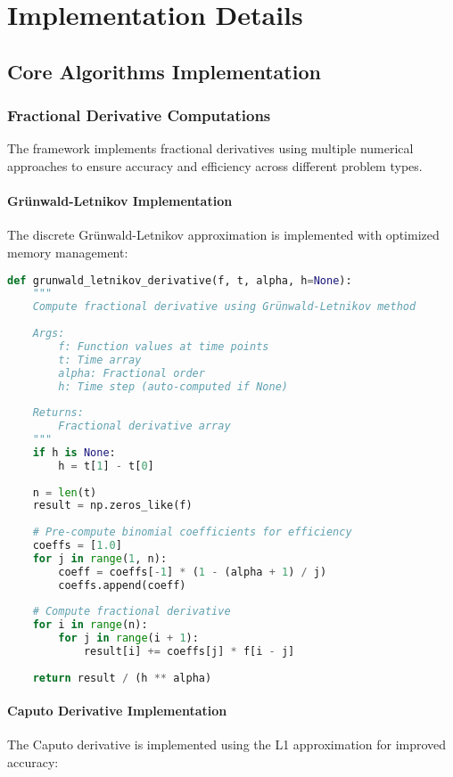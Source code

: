 \section{Implementation Details}

\subsection{Core Algorithms Implementation}

\subsubsection{Fractional Derivative Computations}

The framework implements fractional derivatives using multiple numerical approaches to ensure accuracy and efficiency across different problem types.

\paragraph{Grünwald-Letnikov Implementation}
The discrete Grünwald-Letnikov approximation is implemented with optimized memory management:

\begin{lstlisting}[language=Python, caption=Grünwald-Letnikov Implementation]
def grunwald_letnikov_derivative(f, t, alpha, h=None):
    """
    Compute fractional derivative using Grünwald-Letnikov method
    
    Args:
        f: Function values at time points
        t: Time array
        alpha: Fractional order
        h: Time step (auto-computed if None)
    
    Returns:
        Fractional derivative array
    """
    if h is None:
        h = t[1] - t[0]
    
    n = len(t)
    result = np.zeros_like(f)
    
    # Pre-compute binomial coefficients for efficiency
    coeffs = [1.0]
    for j in range(1, n):
        coeff = coeffs[-1] * (1 - (alpha + 1) / j)
        coeffs.append(coeff)
    
    # Compute fractional derivative
    for i in range(n):
        for j in range(i + 1):
            result[i] += coeffs[j] * f[i - j]
    
    return result / (h ** alpha)
\end{lstlisting}

\paragraph{Caputo Derivative Implementation}
The Caputo derivative is implemented using the L1 approximation for improved accuracy:


